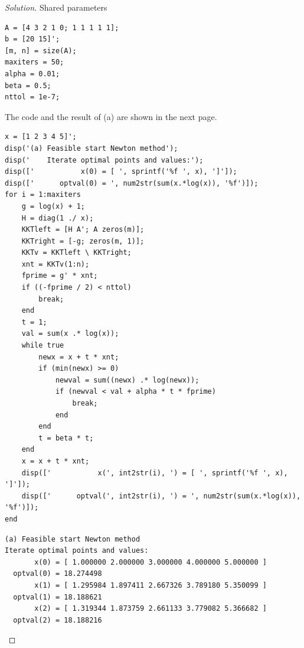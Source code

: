 \documentclass[12pt]{extarticle}
\theoremstyle{definition}
\begin{document}
\begin{proof}[Solution]
  \let\qed\relax
  Shared parameters
\begin{lstlisting}[style=Matlab-editor]
% file: hw7_1.m
A = [4 3 2 1 0; 1 1 1 1 1];
b = [20 15]';
[m, n] = size(A);
maxiters = 50;
alpha = 0.01;
beta = 0.5;
nttol = 1e-7;
\end{lstlisting}

The code and the result of (a) are shown in the next page.
\begin{lstlisting}[style=Matlab-editor]
% (a) Feasible start Newton method
x = [1 2 3 4 5]';
disp('(a) Feasible start Newton method');
disp('    Iterate optimal points and values:');
disp(['           x(0) = [ ', sprintf('%f ', x), ']']);
disp(['      optval(0) = ', num2str(sum(x.*log(x)), '%f')]);
for i = 1:maxiters
    g = log(x) + 1;
    H = diag(1 ./ x);
    KKTleft = [H A'; A zeros(m)];
    KKTright = [-g; zeros(m, 1)];
    KKTv = KKTleft \ KKTright;
    xnt = KKTv(1:n);
    fprime = g' * xnt;
    if ((-fprime / 2) < nttol)
        break;
    end
    t = 1;
    val = sum(x .* log(x));
    while true
        newx = x + t * xnt;
        if (min(newx) >= 0)
            newval = sum((newx) .* log(newx));
            if (newval < val + alpha * t * fprime)
                break;
            end
        end
        t = beta * t;
    end
    x = x + t * xnt;
    disp(['           x(', int2str(i), ') = [ ', sprintf('%f ', x), ']']);
    disp(['      optval(', int2str(i), ') = ', num2str(sum(x.*log(x)), '%f')]);
end
\end{lstlisting}

\begin{lstlisting}[style=Matlab-editor]
(a) Feasible start Newton method
Iterate optimal points and values:
       x(0) = [ 1.000000 2.000000 3.000000 4.000000 5.000000 ]
  optval(0) = 18.274498
       x(1) = [ 1.295984 1.897411 2.667326 3.789180 5.350099 ]
  optval(1) = 18.188621
       x(2) = [ 1.319344 1.873759 2.661133 3.779082 5.366682 ]
  optval(2) = 18.188216
\end{lstlisting}


\end{proof}
\end{document}
